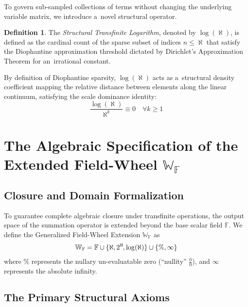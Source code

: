 \documentclass[11pt,a4paper]{article}
\newcommand\nfex{\hspace{-0.2ex}} %
\theoremstyle{definition}
\newtheorem{definition}{Definition}[section]
\theoremstyle{noperiod}
\begin{document}
To govern sub-sampled collections of terms without changing the underlying variable matrix, we introduce a~novel structural operator.
\begin{definition}
The \textit{Structural Transfinite Logarithm}, denoted by $\log(\aleph)$, is defined as the cardinal count of the sparse subset of indices $n \le \aleph$ that satisfy the Diophantine approximation threshold dictated by Dirichlet’s Approximation Theorem for an~irrational constant.
\end{definition}
By definition of Diophantine sparsity, $\log(\aleph)$ acts as a~structural density coefficient mapping the relative distance between elements along the linear continuum, satisfying the scale dominance identity:
\begin{equation}
\frac{\log(\aleph)}{\aleph^k} \equiv 0 \quad \forall k \ge 1
\end{equation}

\section{The Algebraic Specification of the Extended Field-Wheel $\mathbb{W}_{\mathbb{F}}$}

\subsection{Closure and Domain Formalization}

To guarantee complete algebraic closure under transfinite operations, the output space of the summation operator is extended beyond the base scalar field $\mathbb{F}$.
We define the Generalized Field-Wheel Extension $\mathbb{W}_{\mathbb{F}}$ as
\begin{equation}
\mathbb{W}_{\mathbb{F}} = \mathbb{F} \cup \{ \aleph , 2^\aleph \nfex, \log(\aleph) \} \cup \{ \%, \infty \}
\end{equation}
where $\%$ represents the nullary un-evaluatable zero (``nullity'' $\frac{0}{0}$), and $\infty$ represents the absolute infinity.

\subsection{The Primary Structural Axioms}

\end{document}
